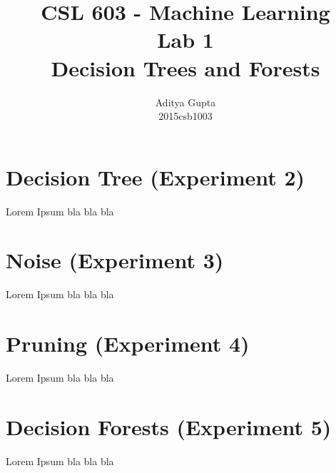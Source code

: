\documentclass{article}
\title{CSL 603 - Machine Learning\\Lab 1\\Decision Trees and Forests}
\author{Aditya Gupta\\2015csb1003}
\begin{document}
\maketitle
\section*{Decision Tree (Experiment 2)}
Lorem Ipsum bla bla bla
\section*{Noise (Experiment 3)}
Lorem Ipsum bla bla bla
\section*{Pruning (Experiment 4)}
Lorem Ipsum bla bla bla
\section*{Decision Forests (Experiment 5)}
Lorem Ipsum bla bla bla
\end{document}
